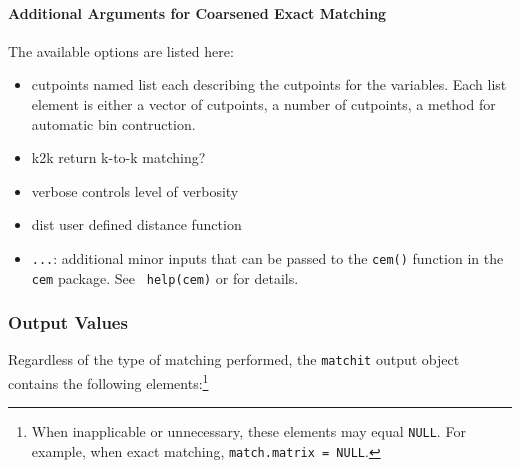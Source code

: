 \paragraph{Additional Arguments for Coarsened Exact Matching}
\label{subsubsec:inputs-cem}

The available options are listed here:
\begin{itemize}
\item{cutpoints} named list each describing the cutpoints for the
    variables.  Each list element is either a vector of cutpoints, a
    number of cutpoints, a method for automatic bin contruction.
\item{k2k} return k-to-k matching?
\item{verbose} controls level of verbosity
\item{dist} user defined distance function 
\item {\tt ...}: additional minor inputs that can be passed to the
  {\tt cem()} function in the {\tt cem} package. See {\tt
    help(cem)} or
  for details.
\end{itemize}

\subsubsection{Output Values}
\label{sec:outputs}

Regardless of the type of matching performed, the \texttt{matchit}
output object contains the following elements:\footnote{When
  inapplicable or unnecessary, these elements may equal {\tt NULL}.
  For example, when exact matching, {\tt match.matrix = NULL}.}

